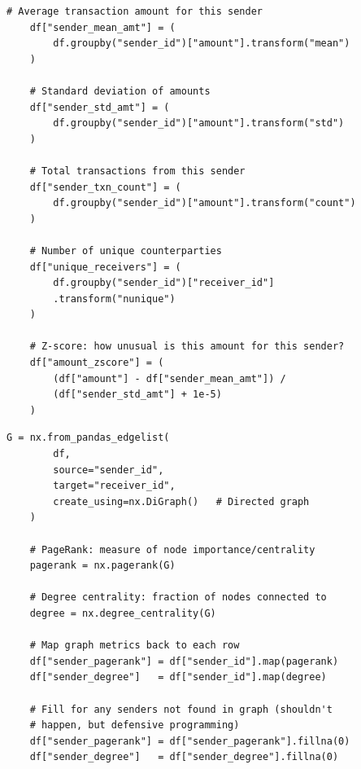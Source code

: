 \begin{lstlisting}[caption={Stage 4 -- Behavioral profiling per sender}, label={lst:stage4}]
    # Average transaction amount for this sender
    df["sender_mean_amt"] = (
        df.groupby("sender_id")["amount"].transform("mean")
    )

    # Standard deviation of amounts
    df["sender_std_amt"] = (
        df.groupby("sender_id")["amount"].transform("std")
    )

    # Total transactions from this sender
    df["sender_txn_count"] = (
        df.groupby("sender_id")["amount"].transform("count")
    )

    # Number of unique counterparties
    df["unique_receivers"] = (
        df.groupby("sender_id")["receiver_id"]
        .transform("nunique")
    )

    # Z-score: how unusual is this amount for this sender?
    df["amount_zscore"] = (
        (df["amount"] - df["sender_mean_amt"]) /
        (df["sender_std_amt"] + 1e-5)
    )
\end{lstlisting}

\begin{lstlisting}[caption={Stage 5 -- Graph construction and centrality features}, label={lst:stage5}]
    G = nx.from_pandas_edgelist(
        df,
        source="sender_id",
        target="receiver_id",
        create_using=nx.DiGraph()   # Directed graph
    )

    # PageRank: measure of node importance/centrality
    pagerank = nx.pagerank(G)

    # Degree centrality: fraction of nodes connected to
    degree = nx.degree_centrality(G)

    # Map graph metrics back to each row
    df["sender_pagerank"] = df["sender_id"].map(pagerank)
    df["sender_degree"]   = df["sender_id"].map(degree)

    # Fill for any senders not found in graph (shouldn't
    # happen, but defensive programming)
    df["sender_pagerank"] = df["sender_pagerank"].fillna(0)
    df["sender_degree"]   = df["sender_degree"].fillna(0)
\end{lstlisting}

